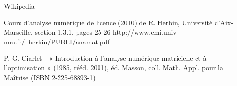 \begin{thebibliography}{9}
  Wikipedia%

  Cours d'analyse numérique de licence (2010) de R. Herbin, Université d'Aix-Marseille, section 1.3.1, pages 25-26
  http://www.cmi.univ-mrs.fr/~herbin/PUBLI/anamat.pdf
  
  P. G. Ciarlet - « Introduction à l'analyse numérique matricielle et à l'optimisation » (1985, rééd. 2001), éd. Masson, coll. Math. Appl. pour la Maîtrise (ISBN 2-225-68893-1)


  

\end{thebibliography}
